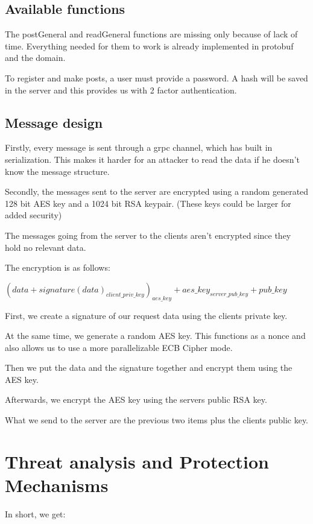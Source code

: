 \documentclass[10pt,twocolumn]{article}
\begin{document}
\subsection{Available functions}

The postGeneral and readGeneral functions are missing only because of lack of time.
Everything needed for them to work is already implemented in protobuf and the domain.

To register and make posts, a user must provide a password. A hash will be saved in the server and this provides us with 2 factor authentication.

\subsection{Message design}

Firstly, every message is sent through a grpc channel, which has built in serialization.
This makes it harder for an attacker to read the data if he doesn't know the message structure.

Secondly, the messages sent to the server are encrypted using a random generated 128 bit AES key and a 1024 bit RSA keypair.
(These keys could be larger for added security)

The messages going from the server to the clients aren't encrypted since they hold no relevant data.

The encryption is as follows:

$(data + signature(data)_{client\_priv\_key})_{aes\_key} + aes\_key_{server\_pub\_key} + pub\_key$

First, we create a signature of our request data using the clients private key.

At the same time, we generate a random AES key. This functions as a nonce and also allows us to use a more parallelizable ECB Cipher mode.

Then we put the data and the signature together and encrypt them using the AES key.

Afterwards, we encrypt the AES key using the servers public RSA key.

What we send to the server are the previous two items plus the clients public key.

\section{Threat analysis and Protection Mechanisms}

In short, we get:
\end{document}
